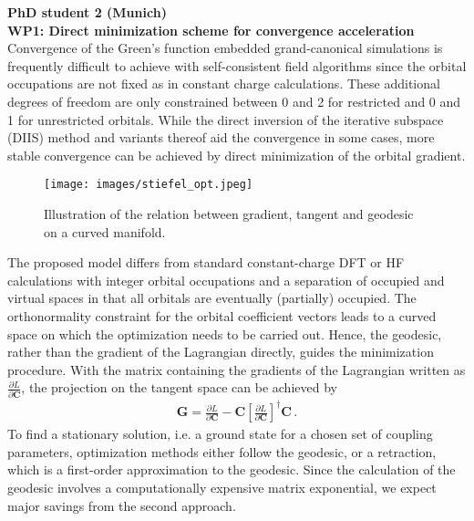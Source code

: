 \documentclass[a4paper,11pt,headings=normal]{scrartcl}
\begin{document}
\begin{itemize}
\noindent
\textbf{PhD student 2 (Munich)}\\

\noindent
\textbf{WP1: Direct minimization scheme for convergence acceleration} 
Convergence of the Green's function embedded grand-canonical simulations is frequently difficult to achieve with self-consistent field algorithms since the orbital occupations are not fixed as in constant charge calculations. These additional degrees of freedom are only constrained between 0 and 2 for restricted and 0 and 1 for unrestricted orbitals. 
While the direct inversion of the iterative subspace (DIIS) method\autocite{Pulay1980,Pulay1982} and variants thereof\autocite{kudin2002,hu2010,garza2012} aid the convergence in some cases, more stable convergence can be achieved by direct minimization of the orbital gradient.\autocite{voorhis2002}\\
\begin{wrapfigure}{r}{0.5\textwidth}
	\centering
	\vspace{-1em}
	\texttt{[image: images/stiefel\_opt.jpeg]}
	\vspace{-2.5em}    
	\caption{Illustration of the relation between gradient, tangent and geodesic on a curved manifold.}
	\label{fig:stiefel}
  \vspace{-1em}  
\end{wrapfigure}\noindent
The proposed model differs from standard constant-charge DFT or HF calculations 
with integer orbital occupations and a separation of occupied and virtual spaces 
in that all orbitals are eventually (partially) occupied. The orthonormality 
constraint for the orbital coefficient vectors leads to a curved space on which 
the optimization needs to be carried out. Hence, the geodesic, rather than the 
gradient of the Lagrangian directly, guides the minimization procedure. With the 
matrix containing the gradients of the Lagrangian written as $\frac{\partial 
L}{\partial \mathbf{C}}$, the projection on the tangent space can be achieved 
by\autocite{edelman1989}
\begin{align}
\mathbf{G} = \frac{\partial L}{\partial \mathbf{C}} - \mathbf{C}\left[ \frac{\partial L}{\partial \mathbf{C}} \right]^\dagger \mathbf{C}\, .
\end{align}
To find a stationary solution, i.e. a ground state for a chosen set of coupling parameters, optimization methods either follow the geodesic, or a retraction, which is a first-order approximation to the geodesic.\autocite{gao2021} Since the calculation of the geodesic involves a computationally expensive matrix exponential, we expect major savings from the second approach.\\

\end{itemize}
\end{document}
